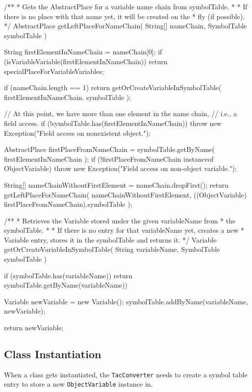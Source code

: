 \begin{javacode}
/**
 * Gets the AbstractPlace for a variable name chain from symbolTable.
 *
 * If there is no place with that name yet, it will be created on the
 * fly (if possible).
 */
AbstractPlace getLeftPlaceForNameChain(
  String[] nameChain, SymbolTable symbolTable
) {
  String firstElementInNameChain = nameChain[0];
  if (isVariableVariable(firstElementInNameChain)) {
    return specialPlaceForVariableVariables;
  }

  if (nameChain.length == 1) {
    return getOrCreateVariableInSymbolTable(
      firstElementInNameChain. symbolTable
    );
  }

  // At this point, we have more than one element in the name chain,
  // i.e., a field access.
  if (!symbolTable.has(firstElementInNameChain)) {
    throw new Exception("Field access on nonexistent object.");
  }

  AbstractPlace firstPlaceFromNameChain = symbolTable.getByName(
    firstElementInNameChain
  );
  if (!firstPlaceFromNameChain instanceof ObjectVariable) {
    throw new Exception("Field access on non-object variable.");
  }

  String[] nameChainWithoutFirstElement = nameChain.dropFirst();
  return getLeftPlaceForNameChain(
    nameChainWithoutFirstElement,
    ((ObjectVariable) firstPlaceFromNameChain).symbolTable
  );
}
\end{javacode}

\begin{javacode}
/**
 * Retrieves the Variable stored under the given variableName from
 * the symbolTable.
 *
 * If there is no entry for that variableName yet, creates a new
 * Variable entry, stores it in the symbolTable and returns it.
 */
Variable getOrCreateVariableInSymbolTable(
  String variableName, SymbolTable symbolTable
) {
  if (symbolTable.has(variableName)) {
    return symbolTable.getByName(variableName))
  }

  Variable newVariable = new Variable();
  symbolTable.addByName(variableName, newVariable);

  return newVariable;
}
\end{javacode}


\subsection{Class Instantiation}

When a class gets instantiated, the \texttt{TacConverter} needs to create a symbol table entry to store a new \texttt{ObjectVariable} instance in.

